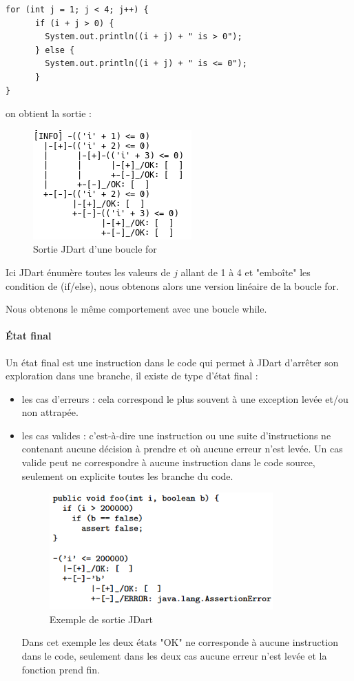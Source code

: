 \begin{verbatim}
for (int j = 1; j < 4; j++) {
      if (i + j > 0) {
      	System.out.println((i + j) + " is > 0");
      } else {
      	System.out.println((i + j) + " is <= 0");
      }
}
\end{verbatim}
on obtient la sortie :
\begin{figure}[H]
 \centering
 \includegraphics[]{./images/jdart_loops.png}
 \caption{Sortie JDart d'une boucle for}
\end{figure}

Ici JDart énumère toutes les valeurs de $j$ allant de 1 à 4 et "embo\^ite" les 
condition de (if/else), nous obtenons alors une version linéaire de la boucle 
for.

Nous obtenons le même comportement avec une boucle while.

\paragraph{État final}
Un état final est une instruction dans le code qui permet à JDart d'arrêter son 
exploration dans une branche, il existe de type d'état final : 
\begin{itemize}
 \item les cas d'erreurs : cela correspond le plus souvent à une exception 
levée et/ou non attrapée.
 \item les cas valides : c'est-à-dire une instruction ou une suite 
d'instructions ne contenant aucune décision à prendre et où aucune erreur n'est 
levée. Un cas valide peut ne correspondre à aucune instruction dans le code 
source, seulement on explicite toutes les branche du code.

\begin{figure}[H]
	\centering	
	\includegraphics[scale=0.5]{images/jdart_exemple.png}
	\caption{\label{fig:jdart_sample} Exemple de sortie JDart}
	\label{fig:exemple_out_jdart}
\end{figure}

Dans cet exemple les deux états "OK" ne corresponde à aucune instruction dans 
le code, seulement dans les deux cas aucune erreur n'est levée et la fonction 
prend fin.

\end{itemize}

